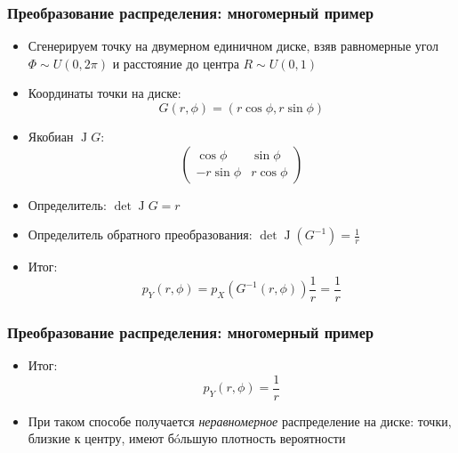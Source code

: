\documentclass[handout,10pt]{beamer}
\begin{document}
\begin{frame}[fragile]
\frametitle{Преобразование распределения: многомерный пример}
\begin{itemize}
\item Сгенерируем точку на двумерном единичном диске, взяв равномерные угол \begin{math}\Phi\sim U(0,2\pi)\end{math} и расстояние до центра \begin{math}R\sim U(0,1)\end{math}
\pause
\item Координаты точки на диске: \begin{equation*}G(r,\phi) = (r\cos\phi, r\sin\phi)\end{equation*}
\pause
\item Якобиан \begin{math}\operatorname J G\end{math}:
\begin{equation*}
\begin{pmatrix}
\cos\phi & \sin\phi \\
-r\sin\phi & r\cos\phi
\end{pmatrix}
\end{equation*}
\pause
\item Определитель: \begin{math}\det \operatorname J G = r\end{math}
\pause
\item Определитель обратного преобразования: \begin{math}\det \operatorname J(G^{-1}) = \frac{1}{r}\end{math}
\pause
\item Итог: \begin{equation*}p_Y(r,\phi) = p_X(G^{-1}(r, \phi)) \frac{1}{r} = \frac{1}{r}\end{equation*}
\end{itemize}
\end{frame}

\begin{frame}[fragile]
\frametitle{Преобразование распределения: многомерный пример}
\begin{itemize}
\item Итог: \begin{equation*}p_Y(r,\phi) = \frac{1}{r}\end{equation*}
\pause
\item При таком способе получается \textit{неравномерное} распределение на диске: точки, близкие к центру, имеют бóльшую плотность вероятности
\end{itemize}
\end{frame}
\end{document}

